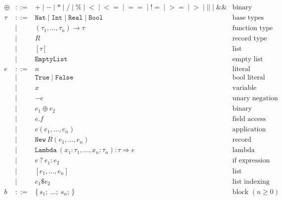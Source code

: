 \documentclass[11pt,a4paper]{article}
\newcommand{\kw}[1]{\mathtt{#1}}                     %
\begin{document}
\[
\begin{array}{rcll}
  \oplus & ::=  & \kw{+} \mid \kw{-} \mid \kw{*} \mid \kw{/} \mid \kw{\%}
                  \mid \kw{<} \mid \kw{<=} \mid \kw{==} \mid \kw{!=} \mid \kw{>=} \mid \kw{>} 
                  \mid \kw{||} \mid \kw{\&\&}
                & \text{binary operators} \\[4pt]
  \tau   & ::=  & \kw{Nat} \mid \kw{Int} \mid \kw{Real} \mid \kw{Bool}  & \text{base types} \\
         & \mid & (\tau_1, \dots, \tau_n) \to \tau        & \text{function type} \\
         & \mid & R                                       & \text{record type} \\[4pt]
         & \mid & [\tau]                                  & \text{list} \\[4pt]
         & \mid & \kw{EmptyList}                                  & \text{empty list} \\[4pt]
  e      & ::=  & n                                       & \text{literal} \\
         & \mid & \kw{True} \mid \kw{False}               & \text{bool literal} \\
         & \mid & x                                       & \text{variable} \\
         & \mid & -e                                      & \text{unary negation} \\
         & \mid & e_1 \oplus e_2                          & \text{binary operation} \\
         & \mid & e.f                                     & \text{field access} \\
         & \mid & e(e_1, \dots, e_n)                      & \text{application} \\
         & \mid & \kw{New}\ R(e_1, \dots, e_n)                  & \text{record construction} \\
         & \mid & \kw{Lambda}\ (x_1 : \tau_1, \dots, x_n : \tau_n) : \tau \Rightarrow e
                                                          & \text{lambda} \\
         & \mid & e\ ?\ e_1 : e_2                         & \text{if expression} \\[4pt]
		 & \mid & [e_1, \ldots, e_n]                      & \text{list construction} \\
		 & \mid & e_1\kw{\$}e_2                                    & \text{list indexing} \\
  b      & ::=  & \{\, s_1;\ \dots;\ s_n; \,\}            & \text{block } (n \ge 0) \\[4pt]

\end{array}\]
\end{document}
